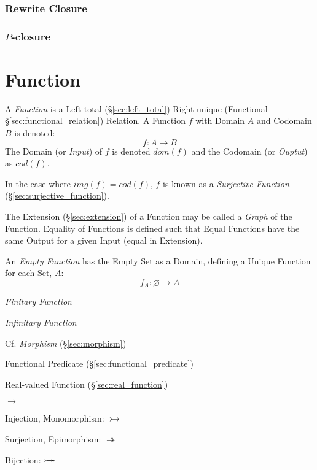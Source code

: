\subsubsection{Rewrite Closure}\label{sec:rewrite_closure}

\subsubsection{$P$-closure}\label{sec:p_closure}



\section{Function}\label{sec:set_function}

A \emph{Function} is a Left-total (\S\ref{sec:left_total})
Right-unique (Functional \S\ref{sec:functional_relation}) Relation. A
Function $f$ with Domain $A$ and Codomain $B$ is denoted:
\[
  f : A \to B
\]
The Domain (or \emph{Input}) of $f$ is denoted $dom(f)$ and the
Codomain (or \emph{Ouptut}) as $cod(f)$.

In the case where $img(f) = cod(f)$, $f$ is known as a
\emph{Surjective Function} (\S\ref{sec:surjective_function}).

The Extension (\S\ref{sec:extension}) of a Function may be called a
\emph{Graph} of the Function. Equality of Functions is defined such
that Equal Functions have the same Output for a given Input (equal in
Extension).

An \emph{Empty Function} has the Empty Set as a Domain, defining a
Unique Function for each Set, $A$:
\[
  f_A : \varnothing \to A
\]

\emph{Finitary Function}

\emph{Infinitary Function}

\fist Cf. \emph{Morphism} (\S\ref{sec:morphism})

Functional Predicate (\S\ref{sec:functional_predicate})

Real-valued Function (\S\ref{sec:real_function})

$\to$

Injection, Monomorphism: $\rightarrowtail$

Surjection, Epimorphism: $\twoheadrightarrow$

Bijection: $\rightarrowtail \hspace{-8pt} \twoheadrightarrow$

